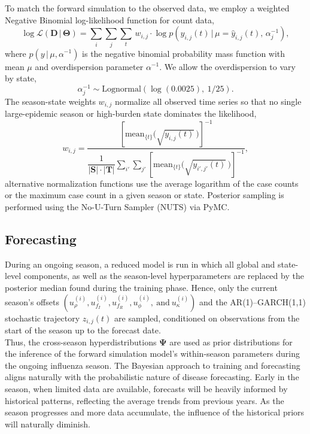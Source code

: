 \documentclass[11pt]{article}
\newcommand{\given}{\,|\,}
\newcommand{\Lognormal}{\text{Lognormal}}
\begin{document}
 
To match the forward simulation to the observed data, we employ a weighted Negative Binomial log-likelihood function for count data, 
\begin{equation}
    \log \mathcal{L}(\bm{D} \given \bm{\Theta}) = \sum_{i}\sum_{j}\sum_{t}\, w_{i,j} \cdot \log p \!\left(y_{i,j}(t) \given \mu = \hat{y}_{i,j}(t),\, \alpha^{-1}_{j}\right),
\end{equation}
where $p(y \given \mu, \alpha^{-1})$ is the negative binomial probability mass function with mean $\mu$ and overdispersion parameter $\alpha^{-1}$. We allow the overdispersion to vary by state,
\begin{equation}
    \alpha^{-1}_j \sim \Lognormal\!\left(\log(0.0025),\ 1/25\right).
\end{equation}
The season-state weights $w_{i,j}$ normalize all observed time series so that no single large-epidemic season or high-burden state dominates the likelihood,
\begin{equation}
    w_{i,j} = \frac{\left[ \text{mean}_{\{t\}} \big( \sqrt{y_{i,j}(t)}\, \big) \right]^{-1}}{\dfrac{1}{|\bm{S}| \cdot |\bm{T}|} \displaystyle\sum_{i'}\sum_{j'}  \left[ \text{mean}_{\{t\}} \big( \sqrt{y_{i',j'}(t)}\, \big) \right]^{-1}},
\end{equation}
alternative normalization functions use the average logarithm of the case counts or the maximum case count in a given season or state. Posterior sampling is performed using the No-U-Turn Sampler (NUTS) via PyMC.
 
\subsection{Forecasting}

During an ongoing season, a reduced model is run in which all global and state-level components, as well as the season-level hyperparameters are replaced by the posterior median found during the training phase. Hence, only the current season's offsets $\left(u^{(i)}_\rho, u^{(i)}_{f_I}, u^{(i)}_{f_R}, u^{(i)}_{\phi},\ \text{and}\ u^{(i)}_{\kappa}\right)$ and the AR(1)--GARCH(1,1) stochastic trajectory $z_{i,j}(t)$ are sampled, conditioned on observations from the start of the season up to the forecast date.\\

Thus, the cross-season hyperdistributions $\bm{\Psi}$ are used as prior distributions for the inference of the forward simulation model's within-season parameters during the ongoing influenza season. The Bayesian approach to training and forecasting aligns naturally with the probabilistic nature of disease forecasting. Early in the season, when limited data are available, forecasts will be heavily informed by historical patterns, reflecting the average trends from previous years. As the season progresses and more data accumulate, the influence of the historical priors will naturally diminish. 
\end{document}
